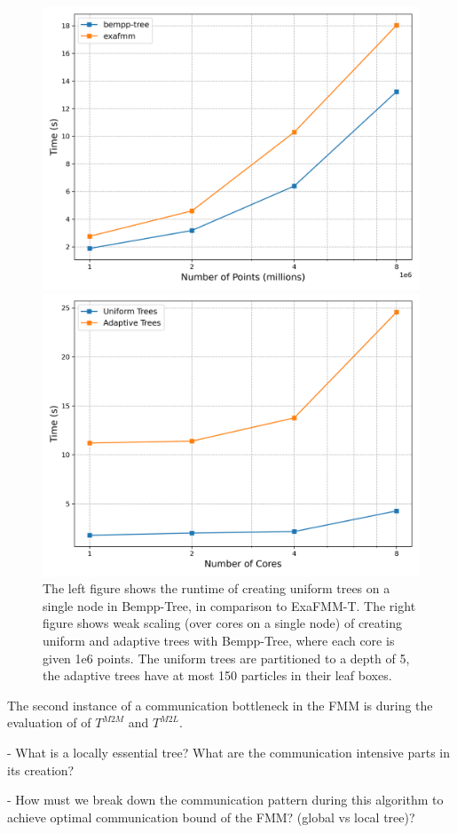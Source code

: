 \begin{figure}[h]
  \centering
  \begin{minipage}[b]{0.45\textwidth}
    \includegraphics[width=\textwidth]{images/ch_3/single_node_scaling.png}
  \end{minipage}
  \hfill
  \begin{minipage}[b]{0.45\textwidth}
    \includegraphics[width=\textwidth]{images/ch_3/weak_scaling_graph.png}
  \end{minipage}
\caption{The left figure shows the runtime of creating uniform trees on a single node in Bempp-Tree, in comparison to ExaFMM-T. The right figure shows weak scaling (over cores on a single node) of creating uniform and adaptive trees with Bempp-Tree, where each core is given 1e6 points. The uniform trees are partitioned to a depth of 5, the adaptive trees have at most 150 particles in their leaf boxes.}
\label{fig:chpt:3:sec:0:single_node_scaling}
\end{figure}


The second instance of a communication bottleneck in the FMM is during the evaluation of of $T^{M2M}$ and $T^{M2L}$.

- What is a locally essential tree? What are the communication intensive parts in its creation?

- How must we break down the communication pattern during this algorithm to achieve optimal communication bound of the FMM? (global vs local tree)?

